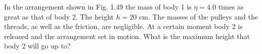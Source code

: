 \item In the arrangement shown in Fig. 1.49 the mass of body 1 is $\eta=4.0$ times as great as that of body 2. The height $h=20 \text{ cm}$. The masses of the pulleys and the threads, as well as the friction, are negligible. At a certain moment body 2 is released and the arrangement set in motion. What is the maximum height that body 2 will go up to?
    \begin{center}
    \end{center}
\begin{solution}
    \begin{center}
    \end{center}
    

\end{solution}
